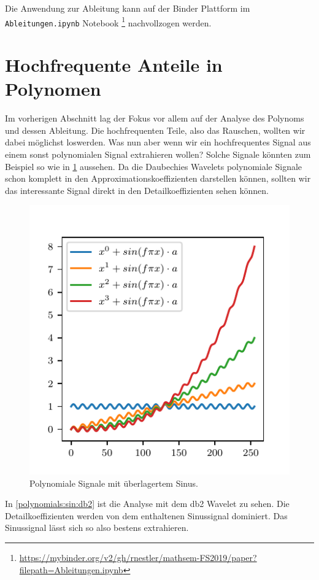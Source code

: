 \begin{refsection}
Die Anwendung zur Ableitung kann auf der Binder Plattform im
\texttt{Ableitungen.ipynb} Notebook%
\footnote{\url{https://mybinder.org/v2/gh/rnestler/mathsem-FS2019/paper?filepath=Ableitungen.ipynb}}
nachvollzogen werden.

\section{Hochfrequente Anteile in Polynomen}

Im vorherigen Abschnitt lag der Fokus vor allem auf der Analyse des Polynoms
und dessen Ableitung. Die hochfrequenten Teile, also das Rauschen, wollten wir
dabei möglichst loswerden. Was nun aber wenn wir ein hochfrequentes Signal aus
einem sonst polynomialen Signal extrahieren wollen? Solche Signale könnten zum
Beispiel so wie in \cref{polynomials:sin:signals} aussehen. Da die Daubechies
Wavelets polynomiale Signale schon komplett in den Approximationskoeffizienten
darstellen können, sollten wir das interessante Signal direkt in den
Detailkoeffizienten sehen können.

\begin{figure}
    \centering
    \includegraphics{papers/polynomials/images/polynomials_sin_signals.pdf}
    \caption{Polynomiale Signale mit überlagertem Sinus.\label{polynomials:sin:signals}}
\end{figure}

In \cref{polynomials:sin:db2} ist die Analyse mit dem db2 Wavelet zu sehen. Die
Detailkoeffizienten werden von dem enthaltenen Sinussignal dominiert. Das
Sinussignal lässt sich so also bestens extrahieren.


\end{refsection}
